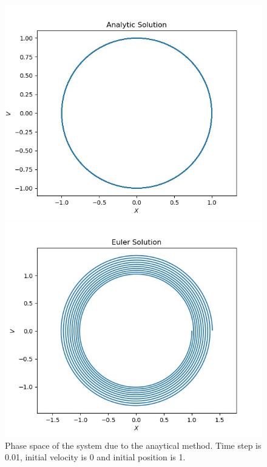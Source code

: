 \documentclass[12pt, a4paper]{article}
\begin{document}
		\begin{figure}[h]
			\centering
			\begin{minipage}[b]{0.4\textwidth}
				\includegraphics[width=\textwidth]{../q2/q2_v_x_Analytic Solution_0_62.83185307179586_0.01_x0=1_v0=0.jpg}
				\caption{Phase space of the system due to the anaytical method. Time step
				is 0.01, initial velocity is 0 and initial position is 1.}
				\label{fig:q2_phase_space_anaytic}
			\end{minipage}
			\hfill
			\begin{minipage}[b]{0.4\textwidth}
				\includegraphics[width=\textwidth]{../q2/q2_v_x_Euler Solution_0_62.83185307179586_0.01_x0=1_v0=0.jpg}

\end{minipage}
\end{figure}
\end{document}
